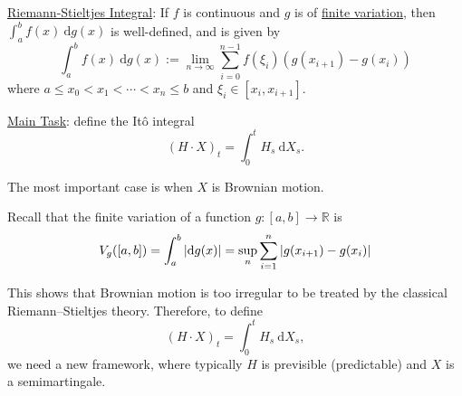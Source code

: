 \underline{Riemann-Stieltjes Integral}: If $f$ is continuous and $g$ is of \underline{finite variation}, then $\int_{a}^{b} f(x) ~ \mathrm{d}g(x)$ is well-defined, and is given by
$$
    \int_{a}^{b} f(x) ~ \mathrm{d}g(x):=\lim_{n\to \infty} \sum_{i=0}^{n-1}f(\xi_{i})\left(g(x_{i+1}) - g(x_{i})\right)
$$
where $a \leq x_{0} < x_{1} < \cdots < x_{n} \leq b$ and $\xi_{i} \in [x_{i}, x_{i+1}]$.

\underline{Main Task}: define the It\^o integral
$$
    (H\cdot X)_{t} = \int_{0}^{t} H_{s} ~\mathrm{d}X_{s}.
$$

The most important case is when $X$ is Brownian motion.


Recall that the finite variation of a function $g:[a,b] \to \mathbb{R}$ is
$$
    V_{g}([a,b]) = \int_{a}^{b} \left|  \mathrm{d}g(x) \right| = \sup_{n}\sum_{i=1}^{n}\left| g(x_{i+1}) - g(x_{i}) \right|
$$


This shows that Brownian motion is too irregular to be treated by the classical Riemann--Stieltjes theory. Therefore, to define
$$
    (H\cdot X)_{t} = \int_{0}^{t} H_{s}~\mathrm{d}X_{s},
$$
we need a new framework, where typically $H$ is previsible (predictable) and $X$ is a semimartingale.


